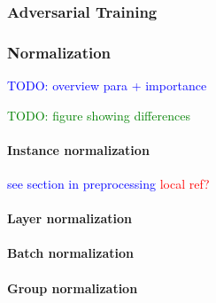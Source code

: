 \subsubsection{Adversarial Training}

\subsubsection{Normalization}

\textcolor{blue}{TODO: overview para + importance}

\textcolor{green}{TODO: figure showing differences}

\paragraph{Instance normalization}

\textcolor{blue}{see section in preprocessing \textcolor{red}{local ref?}}

\paragraph{Layer normalization}

\paragraph{Batch normalization}

\paragraph{Group normalization}
